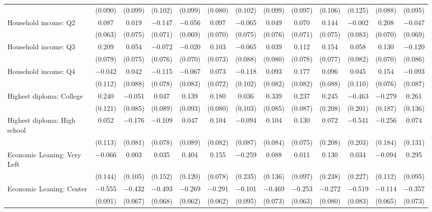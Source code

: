 \begin{tabular}{@{\extracolsep{5pt}}lcccccccccccc}
  & (0.090) & (0.099) & (0.102) & (0.099) & (0.080) & (0.102) & (0.099) & (0.097) & (0.106) & (0.125) & (0.088) & (0.095) \\ 
  Household income: Q2 & 0.087 & 0.019 & $-$0.147 & $-$0.056 & 0.097 & $-$0.065 & 0.049 & 0.070 & 0.144 & $-$0.002 & 0.208 & $-$0.047 \\ 
  & (0.063) & (0.075) & (0.071) & (0.069) & (0.070) & (0.075) & (0.076) & (0.071) & (0.075) & (0.083) & (0.070) & (0.069) \\ 
  Household income: Q3 & 0.209 & 0.054 & $-$0.072 & $-$0.020 & 0.103 & $-$0.065 & 0.039 & 0.112 & 0.154 & 0.058 & 0.130 & $-$0.120 \\ 
  & (0.079) & (0.075) & (0.076) & (0.070) & (0.073) & (0.088) & (0.080) & (0.078) & (0.077) & (0.082) & (0.070) & (0.086) \\ 
  Household income: Q4 & $-$0.042 & 0.042 & $-$0.115 & $-$0.067 & 0.073 & $-$0.118 & 0.093 & 0.177 & 0.096 & 0.045 & 0.154 & $-$0.093 \\ 
  & (0.112) & (0.088) & (0.078) & (0.083) & (0.072) & (0.102) & (0.082) & (0.082) & (0.088) & (0.110) & (0.076) & (0.087) \\ 
  Highest diploma: College & 0.240 & $-$0.051 & 0.047 & 0.139 & 0.180 & 0.036 & 0.339 & 0.237 & 0.245 & $-$0.463 & $-$0.279 & 0.261 \\ 
  & (0.121) & (0.085) & (0.089) & (0.093) & (0.080) & (0.103) & (0.085) & (0.087) & (0.208) & (0.201) & (0.187) & (0.136) \\ 
  Highest diploma: High school & 0.052 & $-$0.176 & $-$0.109 & 0.047 & 0.104 & $-$0.094 & 0.104 & 0.130 & 0.072 & $-$0.541 & $-$0.256 & 0.074 \\ 
  & (0.113) & (0.081) & (0.078) & (0.089) & (0.082) & (0.087) & (0.084) & (0.075) & (0.208) & (0.203) & (0.184) & (0.131) \\ 
  Economic Leaning: Very Left & $-$0.066 & 0.003 & 0.035 & 0.404 & 0.155 & $-$0.259 & 0.088 & 0.011 & 0.130 & 0.034 & $-$0.094 & 0.295 \\ 
  & (0.144) & (0.105) & (0.152) & (0.120) & (0.078) & (0.235) & (0.136) & (0.097) & (0.238) & (0.227) & (0.112) & (0.095) \\ 
  Economic Leaning: Center & $-$0.555 & $-$0.432 & $-$0.493 & $-$0.269 & $-$0.291 & $-$0.101 & $-$0.469 & $-$0.253 & $-$0.272 & $-$0.519 & $-$0.114 & $-$0.357 \\ 
  & (0.091) & (0.067) & (0.068) & (0.062) & (0.062) & (0.095) & (0.073) & (0.063) & (0.080) & (0.083) & (0.065) & (0.073) \\ 

\end{tabular}
